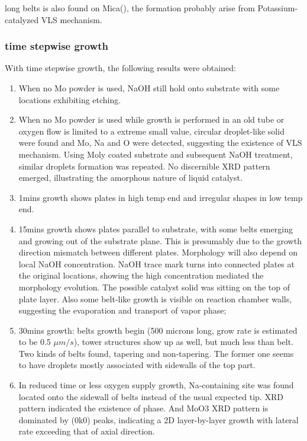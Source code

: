 long belts  is also found on Mica(), the formation probably arise from Potassium-catalyzed VLS mechanism.\cite{Hu2011}

\subsubsection{time stepwise growth}

With time stepwise growth, the following results were obtained:

\begin{enumerate}
\item When no Mo powder is used, NaOH still hold onto substrate with some locations exhibiting etching.
\item When no Mo powder is used while growth is performed in an old tube or oxygen flow is limited to a extreme small value, circular droplet-like solid were found and Mo, Na and O were detected, suggesting the existence of VLS mechanism. Using Moly coated substrate and subsequent NaOH treatment, similar droplets formation was repeated. No discernible XRD pattern emerged, illustrating the amorphous nature of liquid catalyst.
\item 1mins growth shows plates in high temp end and irregular shapes in low temp end.
\item 15mins growth shows  plates parallel to substrate, with some belts emerging and growing out of the substrate plane. This is presumably due to the growth direction mismatch between different plates. Morphology will also depend on local NaOH concentration. NaOH trace mark turns into connected plates at the original locations, showing the high concentration mediated the morphology evolution. The possible catalyst solid was sitting on the top of plate layer. Also some belt-like growth is visible on reaction chamber walls, suggesting the evaporation and transport of  vapor phase;
\item 30mins growth:  belts growth begin (500 microns long, grow rate is estimated to be 0.5 $\mu m/s$), tower structures show up as well, but much less than belt. Two kinds of belts found, tapering and non-tapering. The former one seems to have droplets mostly associated with sidewalls of the top part.
\item In reduced time or less oxygen supply growth, Na-containing site was found located onto the sidewall of belts instead of the usual expected tip. XRD pattern indicated the existence of  phase. And MoO3 XRD pattern is dominated by (0k0) peaks, indicating a 2D layer-by-layer growth with lateral rate exceeding that of axial direction.

\end{enumerate}

